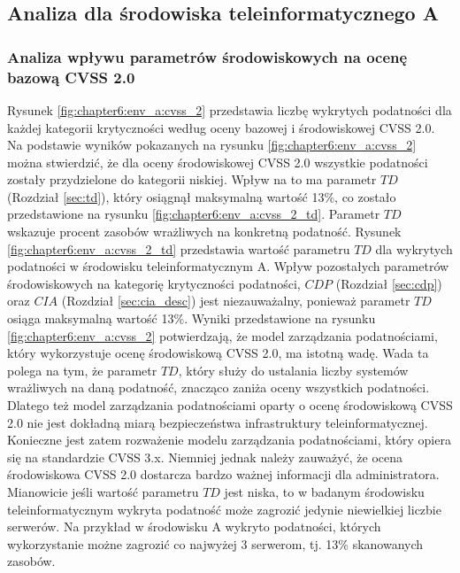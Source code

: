 \subsection{Analiza dla środowiska teleinformatycznego A}


\subsubsection{Analiza wpływu parametrów środowiskowych na ocenę bazową CVSS 2.0}
\label{sec:analiza_cvss2_ev_a}
Rysunek \ref{fig:chapter6:env_a:cvss_2} przedstawia liczbę wykrytych podatności dla każdej kategorii krytyczności według oceny bazowej i środowiskowej CVSS 2.0. Na podstawie wyników pokazanych na rysunku \ref{fig:chapter6:env_a:cvss_2} można stwierdzić, że dla oceny środowiskowej CVSS 2.0 wszystkie podatności zostały przydzielone do kategorii niskiej. Wpływ na to ma parametr $TD$ (Rozdział \ref{sec:td}), który osiągnął maksymalną wartość 13\%, co zostało przedstawione na rysunku \ref{fig:chapter6:env_a:cvss_2_td}. Parametr $TD$ wskazuje procent zasobów wrażliwych na konkretną podatność. Rysunek \ref{fig:chapter6:env_a:cvss_2_td} przedstawia wartość parametru $TD$ dla wykrytych podatności w środowisku teleinformatycznym A. Wpływ pozostałych parametrów środowiskowych na kategorię krytyczności podatności, $CDP$ (Rozdział \ref{sec:cdp}) oraz $CIA$ (Rozdział \ref{sec:cia_desc}) jest niezauważalny, ponieważ parametr $TD$ osiąga maksymalną wartość 13\%. Wyniki przedstawione na rysunku \ref{fig:chapter6:env_a:cvss_2} potwierdzają, że model zarządzania podatnościami, który wykorzystuje ocenę środowiskową CVSS 2.0, ma istotną wadę. Wada ta polega na tym, że parametr $TD$, który służy do ustalania liczby systemów wrażliwych na daną podatność, znacząco zaniża oceny wszystkich podatności. Dlatego też model zarządzania podatnościami oparty o ocenę środowiskową CVSS 2.0 nie jest dokładną miarą bezpieczeństwa infrastruktury teleinformatycznej. Konieczne jest zatem rozważenie modelu zarządzania podatnościami, który opiera się na standardzie CVSS 3.x. Niemniej jednak należy zauważyć, że ocena środowiskowa CVSS 2.0 dostarcza bardzo ważnej informacji dla administratora. Mianowicie jeśli wartość parametru $TD$ jest niska, to w badanym środowisku teleinformatycznym wykryta podatność może zagrozić jedynie niewielkiej liczbie serwerów. Na przykład w środowisku A wykryto podatności, których wykorzystanie możne zagrozić co najwyżej 3 serwerom, tj. 13\% skanowanych zasobów.

